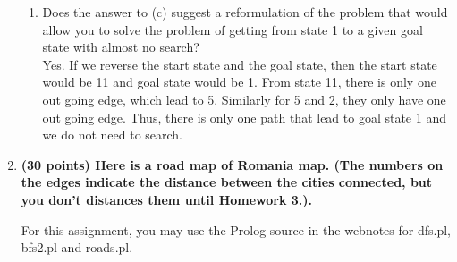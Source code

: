 \documentclass{article}%
\begin{document}
\begin{enumerate}
\begin{enumerate}
	\item Does the answer to (c) suggest a reformulation of the problem that would allow you to
solve the problem of getting from state 1 to a given goal state with almost no search? \\

     Yes. If we reverse the start state and the goal state, then the start state would be 11 and goal state would be 1. From state 11, there is only one out going edge, which lead to 5. Similarly for 5 and 2, they only have one out going edge. Thus, there is only one path that lead to goal state 1 and we do not need to search.

\end{enumerate}
	
\item \textbf{(30 points) Here is a road map of Romania map. (The numbers on the edges indicate the distance between the cities connected, but you don't distances them until Homework 3.).}


For this assignment, you may use the Prolog source in the webnotes for dfs.pl, bfs2.pl and roads.pl. 


\end{enumerate}
\end{document}
